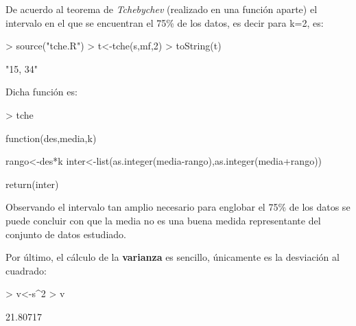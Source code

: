 \documentclass [a4paper] {article}
\begin{document}
\bigskip
De acuerdo al teorema de \textit{Tchebychev} (realizado en una funci\'on aparte) el intervalo en el que se encuentran el 75\%
de los datos, es decir para k=2, es:
\begin{Schunk}
\begin{Sinput}
> source("tche.R")
> t<-tche(s,mf,2)
> toString(t)
\end{Sinput}
\begin{Soutput}
[1] "15, 34"
\end{Soutput}
\end{Schunk}

Dicha funci\'on es:
\begin{Schunk}
\begin{Sinput}
> tche
\end{Sinput}
\begin{Soutput}
function(des,media,k) {
    
    rango<-des*k
    inter<-list(as.integer(media-rango),as.integer(media+rango))

    return(inter)
}
\end{Soutput}
\end{Schunk}

Observando el intervalo tan amplio necesario para englobar el 75\% de los datos se puede concluir con que la media
no es una buena medida representante del conjunto de datos estudiado.

\bigskip
Por \'ultimo, el c\'alculo de la \textbf{varianza} es sencillo, \'unicamente es la desviaci\'on al cuadrado:
\begin{Schunk}
\begin{Sinput}
> v<-s^2
> v
\end{Sinput}
\begin{Soutput}
[1] 21.80717
\end{Soutput}
\end{Schunk}
\end{document}
